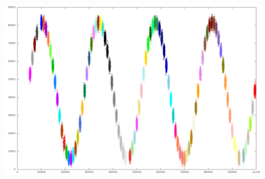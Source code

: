 \documentclass[10pt]{beamer}
\begin{document}
\begin{frame}
	\frametitle{}
	\includegraphics[scale=0.25, keepaspectratio]{../output/pics/sine.png}
\end{frame}
\end{document}
